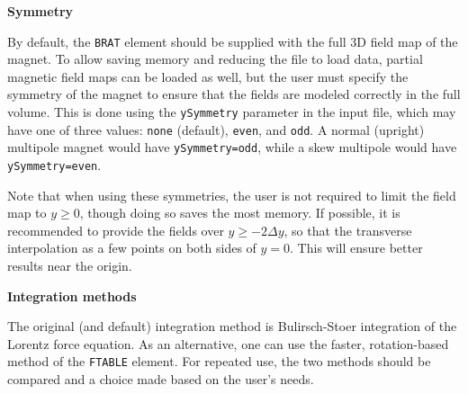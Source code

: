 {\bf Symmetry}

By default, the \verb|BRAT| element should be supplied with the full 3D field map of the magnet.
To allow saving memory and reducing the file to load data, partial magnetic field maps can be 
loaded as well, but the user must specify the symmetry of the magnet to ensure that the fields are
modeled correctly in the full volume.
This is done using the \verb|ySymmetry| parameter in the input file, which may have one of three
values: \verb|none| (default), \verb|even|, and \verb|odd|.  
A normal (upright) multipole magnet would have
\verb|ySymmetry=odd|, while a skew multipole would have \verb|ySymmetry=even|.

Note that when using these symmetries, the user is not required to limit the field map to $y\geq 0$, 
though doing so saves the most memory.
If possible, it is recommended to provide the fields over $y\geq -2\Delta y$,
so that the transverse interpolation as a few points on both sides of $y=0$.
This will ensure better results near the origin.

{\bf Integration methods}

The original (and default) integration method is Bulirsch-Stoer integration of the Lorentz force equation.
As an alternative, one can use the faster, rotation-based method of the \verb|FTABLE| element.
For repeated use, the two methods should be compared and a choice made based on the user's needs.
